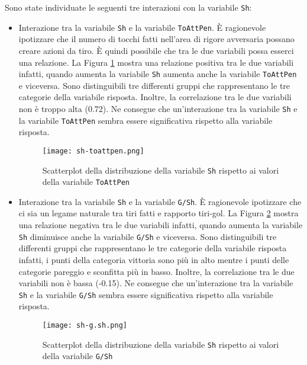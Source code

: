 Sono state individuate le seguenti tre interazioni con la variabile \texttt{Sh}:
\begin{itemize}
	\item Interazione tra la variabile \texttt{Sh} e la variabile \texttt{ToAttPen}. È ragionevole ipotizzare che il numero di tocchi fatti nell'area di rigore avversaria possano creare azioni da tiro. È quindi possibile che tra le due variabili possa esserci una relazione. La Figura \ref{fig:shpen} mostra una relazione positiva tra le due variabili infatti, quando aumenta la variabile \texttt{Sh} aumenta anche la variabile \texttt{ToAttPen} e viceversa. Sono distinguibili tre differenti gruppi che rappresentano le tre categorie della variabile risposta. Inoltre, la correlazione tra le due variabili non è troppo alta (0.72). Ne consegue che un'interazione tra la variabile \texttt{Sh} e la variabile \texttt{ToAttPen} sembra essere significativa rispetto alla variabile risposta.
	\begin{figure}[htbp]
		\begin{center}
			\texttt{[image: sh-toattpen.png]}
			\caption{Scatterplot della distribuzione della variabile \texttt{Sh} rispetto ai valori della variabile \texttt{ToAttPen}}  \label{fig:shpen}
		\end{center}
	\end{figure}
	\item Interazione tra la variabile \texttt{Sh} e la variabile \texttt{G/Sh}. È ragionevole ipotizzare che ci sia un legame naturale tra tiri fatti e rapporto tiri-gol. La Figura \ref{fig:shgol} mostra una relazione negativa tra le due variabili infatti, quando aumenta la variabile \texttt{Sh} diminuisce anche la variabile \texttt{G/Sh} e viceversa. Sono distinguibili tre differenti gruppi che rappresentano le tre categorie della variabile risposta infatti, i punti della categoria vittoria sono più in alto mentre i punti delle categorie pareggio e sconfitta più in basso. Inoltre, la correlazione tra le due variabili non è bassa (-0.15). Ne consegue che un'interazione tra la variabile \texttt{Sh} e la variabile \texttt{G/Sh} sembra essere significativa rispetto alla variabile risposta.
	\begin{figure}[htbp]
		\begin{center}
			\texttt{[image: sh-g.sh.png]}
			\caption{Scatterplot della distribuzione della variabile \texttt{Sh} rispetto ai valori della variabile \texttt{G/Sh}}  \label{fig:shgol}
		\end{center}
	\end{figure}

\end{itemize}
